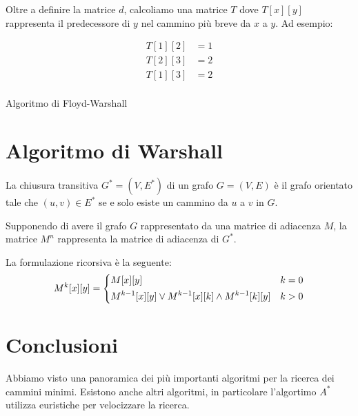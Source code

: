 
Oltre a definire la matrice \(d\), calcoliamo una matrice \(T\) dove \(T[x][y]\) rappresenta il predecessore di \(y\) nel cammino più breve da \(x\) a \(y\).
Ad esempio:

\begin{minipage}[c]{0.5\textwidth}\centering
{}
\end{minipage}%
\begin{minipage}[c]{0.5\textwidth}\centering
\begin{align*}
T[1][2] &= 1 \\
T[2][3] &= 2 \\
T[1][3] &= 2 \\
\end{align*}
\end{minipage}

\begin{algorithm}[H]
	\caption{Algoritmo di Floyd-Warshall}
	
\end{algorithm}

\section{Algoritmo di Warshall}

\begin{definition}
La chiusura transitiva \(G^* = (V, E^*)\) di un grafo \(G = (V, E)\) è il grafo orientato tale che \((u, v) \in E^*\) se e solo esiste un cammino da \(u\) a \(v\) in \(G\).
\end{definition}

Supponendo di avere il grafo \(G\) rappresentato da una matrice di adiacenza \(M\), la matrice \(M^n\) rappresenta la matrice di adiacenza di \(G^*\).

La formulazione ricorsiva è la seguente:
\[
M^{k}[x][y] =
	\begin{dcases}
		M[x][y] & k = 0\\
		M^{k-1}[x][y] \lor M^{k-1}[x][k] \land M^{k-1}[k][y] & k > 0\\
	\end{dcases}
\]

\section*{Conclusioni}

Abbiamo visto una panoramica dei più importanti algoritmi per la ricerca dei cammini minimi.
Esistono anche altri algoritmi, in particolare l'algortimo \(A^*\) utilizza euristiche per velocizzare la ricerca.

\ifsubfile

\fi
